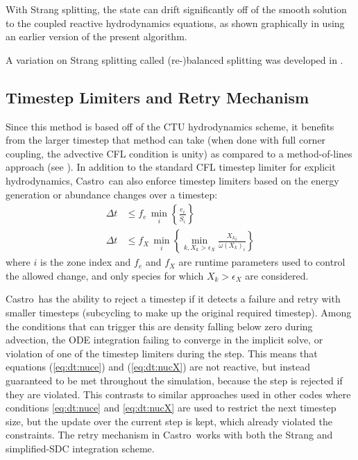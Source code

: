 \documentclass[times,modern]{aastex63}
\newcommand{\castro}{{\sf Castro}}
\newcommand{\omegadot}{\dot{\omega}}
\newcommand{\MarginPar}[1]{\marginpar{\vskip-\baselineskip\raggedright\tiny\sffamily\hrule\smallskip{\color{red}#1}\par\smallskip\hrule}}
\begin{document}
With Strang splitting, the state can drift significantly off of the
smooth solution to the coupled reactive hydrodynamics equations, as
shown graphically in \cite{astronum:2018} using an earlier version of
the present algorithm.

A variation on Strang splitting called (re-)balanced splitting was
developed in \citet{speth:2013}.


\subsection{Timestep Limiters and Retry Mechanism}

Since this method is based off of the CTU hydrodynamics scheme, it
benefits from the larger timestep that method can take (when done with
full corner coupling, the advective CFL condition is unity)
as compared to a method-of-lines approach (see
\citealt{ppmunsplit}).  In addition to the standard CFL timestep
limiter for explicit hydrodynamics, \castro\ can also enforce
timestep limiters based on the energy generation or abundance changes
over a timestep:
\begin{align}
\label{eq:dt:nuce}
\Delta t &\le f_e\, \min_{i} \left\{\frac{e_{i}}{\dot{S}_{i}}\right\} \\
%
\label{eq:dt:nucX}
\Delta t &\le f_X\, \min_{i} \left\{\min_{k,X_k > \epsilon_X}\frac{{X_k}_{i}}{{\omegadot(X_k)_i}}\right\}
\end{align}
where $i$ is the zone index and $f_e$ and $f_X$ are runtime parameters
used to control the allowed change, and only species for which $X_k > \epsilon_X$ are considered.

\castro\ has the ability to reject a timestep if it detects a failure
and retry with smaller timesteps (subcycling to make up the original
required timestep).  Among the conditions that can trigger this are
density falling below zero during advection, the ODE integration
failing to converge in the implicit solve, or violation of one of the
timestep limiters during the step.  This means that equations
(\ref{eq:dt:nuce}) and (\ref{eq:dt:nucX}) are not reactive, but instead
guaranteed to be met throughout the simulation, because the step is
rejected if they are violated.  This contrasts to similar approaches
used in other codes where conditions \ref{eq:dt:nuce} and
\ref{eq:dt:nucX} are used to restrict the next timestep size, but the
update over the current step is kept, which already violated the
constraints. \MarginPar{would be nice to have a reference here} The retry mechanism in \castro\ works with both the
Strang and simplified-SDC integration scheme.
\end{document}

